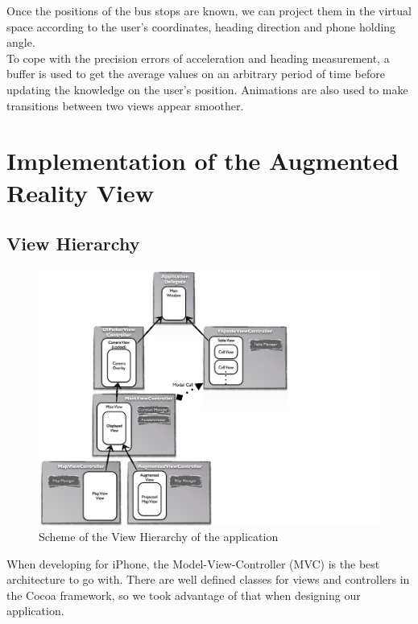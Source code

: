Once the positions of the bus stops are known, we can project them in the virtual space according to the user's coordinates, heading direction and phone holding angle.\\

To cope with the precision errors of acceleration and heading measurement, a buffer is used to get the average values on an arbitrary period of time before updating the knowledge on the user's position. Animations are also used to make transitions between two views appear smoother.

\section{Implementation of the Augmented Reality View}
\label{sec:implementation_of_ar_view}

\subsection{View Hierarchy}

\begin{figure}[ht]
\center
\includegraphics[scale=0.5]{pics/client_view_hierarchy}
\caption{Scheme of the View Hierarchy of the application}
\label{fig:client_view_hierarchy}
\end{figure}

When developing for iPhone, the Model-View-Controller (MVC) is the best architecture to go with. There are well defined classes for views and controllers in the Cocoa framework, so we took advantage of that when designing our application.\\

